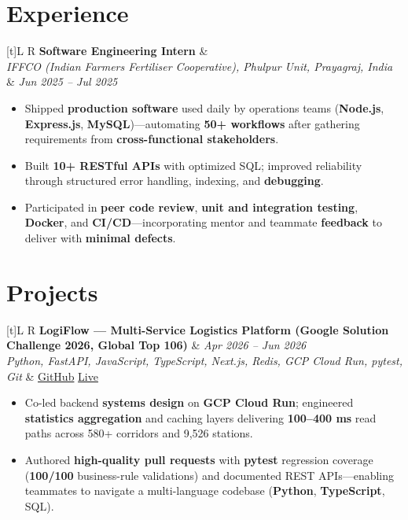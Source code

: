\documentclass[a4paper,10pt]{article}
\newcommand{\resumeSubheading}[4]{%
  \vspace{0.5mm}
  \noindent
  \begin{tabularx}{\textwidth}[t]{L R}
    \textbf{#1} & #4 \\
    \textit{#3} & \textit{#2} \\
  \end{tabularx}
  \vspace{-0.5mm}%
}
\newcommand{\resumeProject}[4]{%
  \vspace{0.5mm}
  \noindent
  \begin{tabularx}{\textwidth}[t]{L R}
    \textbf{#1} & \textit{#3} \\
    \textit{#2} & #4 \\
  \end{tabularx}
  \vspace{-0.5mm}%
}
\begin{document}
\section{Experience}
\small
\resumeSubheading
  {Software Engineering Intern}{Jun 2025 -- Jul 2025}
  {IFFCO (Indian Farmers Fertiliser Cooperative), Phulpur Unit, Prayagraj, India}{}
\begin{itemize}
  \item Shipped \textbf{production software} used daily by operations teams (\textbf{Node.js}, \textbf{Express.js}, \textbf{MySQL})---automating \textbf{50+ workflows} after gathering requirements from \textbf{cross-functional stakeholders}.
  \item Built \textbf{10+ RESTful APIs} with optimized SQL; improved reliability through structured error handling, indexing, and \textbf{debugging}.
  \item Participated in \textbf{peer code review}, \textbf{unit and integration testing}, \textbf{Docker}, and \textbf{CI/CD}---incorporating mentor and teammate \textbf{feedback} to deliver with \textbf{minimal defects}.
\end{itemize}

\section{Projects}
\small

\resumeProject
  {LogiFlow --- Multi-Service Logistics Platform (Google Solution Challenge 2026, Global Top 106)}
  {Python, FastAPI, JavaScript, TypeScript, Next.js, Redis, GCP Cloud Run, pytest, Git}
  {Apr 2026 -- Jun 2026}
  {\href{https://github.com/Ojas-Srivastava05/LogiFlow-Solution-Challenge-2026}{GitHub} \textbar{} \href{https://logi-flow-solution-challenge-2026.vercel.app/}{Live}}
\begin{itemize}
  \item Co-led backend \textbf{systems design} on \textbf{GCP Cloud Run}; engineered \textbf{statistics aggregation} and caching layers delivering \textbf{100--400 ms} read paths across 580+ corridors and 9,526 stations.
  \item Authored \textbf{high-quality pull requests} with \textbf{pytest} regression coverage (\textbf{100/100} business-rule validations) and documented REST APIs---enabling teammates to navigate a multi-language codebase (\textbf{Python}, \textbf{TypeScript}, SQL).
\end{itemize}
\end{document}
